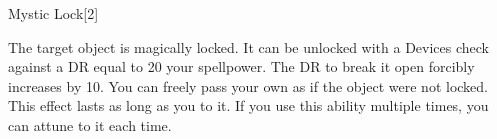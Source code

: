 \begin{spellsection}{Mystic Lock}[2]
\begin{spellcontent}
\begin{spelltargetinginfo}
\end{spelltargetinginfo}
\begin{spelleffects}
\spelleffect
The target object is magically locked.
It can be unlocked with a Devices check against a DR equal to 20 \add your spellpower.
The DR to break it open forcibly increases by 10.
You can freely pass your own  as if the object were not locked.
This effect lasts as long as you  to it.
If you use this ability multiple times, you can attune to it each time.
\end{spelleffects}
\end{spellcontent}
\begin{spellfooter}
\end{spellfooter}
\begin{spellsubcontent}
\end{spellsubcontent}
\end{spellsection}
